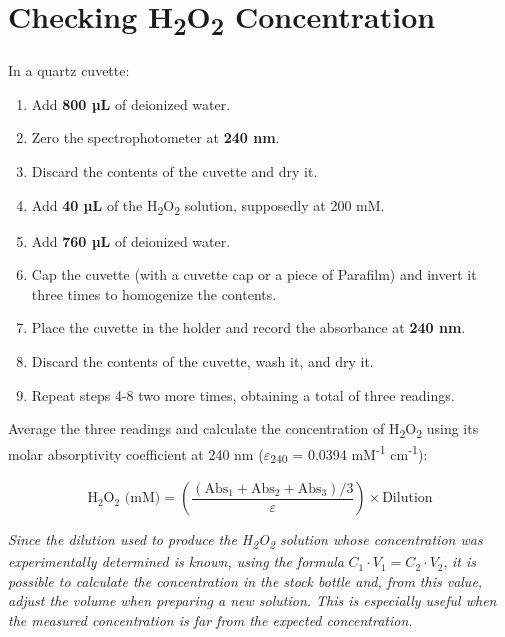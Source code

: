 \documentclass[
  9pt,
  american,
  a5paper,
  extrafontsizes,onecolumn,openright
  ]{memoir}
\providecommand{\tightlist}{%
  \setlength{\itemsep}{0pt}\setlength{\parskip}{0pt}}
\begin{document}
\section{\texorpdfstring{Checking H\textsubscript{2}O\textsubscript{2} Concentration}{Checking H2O2 Concentration}}\label{cat_checking_h2o2}

In a quartz cuvette:

\begin{enumerate}
\def\labelenumi{\arabic{enumi}.}
\tightlist
\item
  Add \textbf{800 µL} of deionized water.
\item
  Zero the spectrophotometer at \textbf{240 nm}.
\item
  Discard the contents of the cuvette and dry it.
\item
  Add \textbf{40 µL} of the H\textsubscript{2}O\textsubscript{2} solution, supposedly at 200 mM.
\item
  Add \textbf{760 µL} of deionized water.
\item
  Cap the cuvette (with a cuvette cap or a piece of Parafilm) and invert it three times to homogenize the contents.
\item
  Place the cuvette in the holder and record the absorbance at \textbf{240 nm}.
\item
  Discard the contents of the cuvette, wash it, and dry it.
\item
  Repeat steps 4-8 two more times, obtaining a total of three readings.
\end{enumerate}

Average the three readings and calculate the concentration of H\textsubscript{2}O\textsubscript{2} using its molar absorptivity coefficient at 240 nm (\(\varepsilon\)\textsubscript{240} = 0.0394 mM\textsuperscript{-1} cm\textsuperscript{-1}):

\[\text{H}_2\text{O}_2 \text{ (mM)} = \left( \frac{\left( \text{Abs}_1 + \text{Abs}_2 + \text{Abs}_3 \right) / 3}{\varepsilon} \right) \times \text{Dilution}\]

\begin{greybox}[frametitle = Note]
\emph{Since the dilution used to produce the H\textsubscript{2}O\textsubscript{2} solution whose concentration was experimentally determined is known, using the formula} \(C_1 \cdot V_1 = C_2 \cdot V_2\), \emph{it is possible to calculate the concentration in the stock bottle and, from this value, adjust the volume when preparing a new solution. This is especially useful when the measured concentration is far from the expected concentration.}

\end{greybox}
\end{document}

